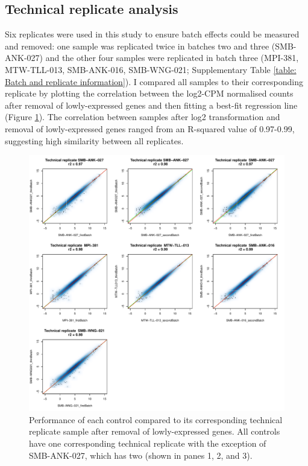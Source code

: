 \documentclass[12pt,a4paper,titlepage,twoside,openright]{book}
\begin{document}
\begin{mainmatter}
{{\section{Technical replicate analysis}
Six replicates were used in this study to ensure batch effects could be measured and removed: one sample was replicated twice in batches two and three (SMB-ANK-027) and the other four samples were replicated in batch three (MPI-381, MTW-TLL-013, SMB-ANK-016, SMB-WNG-021; Supplementary Table \ref{table: Batch and replicate information}). I compared all samples to their corresponding replicate by plotting the correlation between the log2-CPM normalised counts after removal of lowly-expressed genes and then fitting a best-fit regression line (Figure \ref{fig:Replicate Comparisons}). The correlation between samples after log2 transformation and removal of lowly-expressed genes ranged from an R-squared value of 0.97-0.99, suggesting high similarity between all replicates.
\begin{figure}[h!]
\centering
\includegraphics[width=\textwidth,height=\textheight,keepaspectratio]{Figures/replicate_comparisons_postFiltering_123Combined.pdf}
\caption{Performance of each control compared to its corresponding technical replicate sample after removal of lowly-expressed genes. All controls have one corresponding technical replicate with the exception of SMB-ANK-027, which has two (shown in panes 1, 2, and 3).}
\label{fig:Replicate Comparisons}
\end{figure}

}}
\end{mainmatter}
\end{document}
